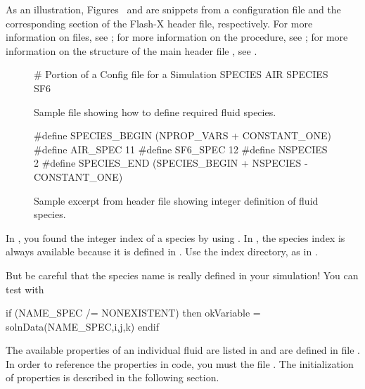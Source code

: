As an illustration, Figures~ and
 are snippets from a configuration file
and the corresponding section of the Flash-X header file, respectively.
 For more information on  files, see ;
for more information on the  procedure, see
;
for more information on the structure of the main header file , see
.


\begin{figure}
\begin{shrink}
\begin{fcodeseg}
# Portion of a Config file for a Simulation
SPECIES AIR
SPECIES SF6
\end{fcodeseg}
\end{shrink}
\caption{Sample  file showing how to define required fluid species.}
\label{fig:MultispeciesConfig}
\end{figure}

\begin{figure}
\begin{shrink}
\begin{fcodeseg}
#define SPECIES_BEGIN (NPROP_VARS + CONSTANT_ONE)
#define AIR_SPEC 11
#define SF6_SPEC 12
#define NSPECIES 2
#define SPECIES_END (SPECIES_BEGIN + NSPECIES - CONSTANT_ONE)
\end{fcodeseg}
\end{shrink}
\caption{Sample excerpt from header file  showing integer definition of fluid species.}
\label{fig:MultispeciesHeader}
\end{figure}


\begin{flashtip}
In \flashx, you found the integer index of a species by using .  In \flashx, the
species index is always available because it is defined in .  Use the index directory, as in
.

But be careful that the species name is really defined in your simulation!  You can test with
\begin{codeseg}
if (NAME_SPEC /= NONEXISTENT) then
    okVariable = solnData(NAME_SPEC,i,j,k)
endif
\end{codeseg}
\end{flashtip}


The available properties of an individual fluid are listed in
and are defined in file .  
In order to reference the properties in code, you must  the file .
The initialization of properties is described in the following section.

